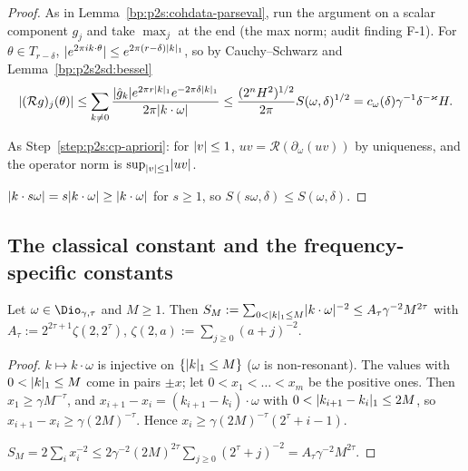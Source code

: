 \begin{proof}
\label{step:p2s2sd:cs-one}
As in Lemma~\ref{bp:p2s:cohdata-parseval}, run the argument on a scalar component $g_j$ and take $\max_j$ at the end (the max norm;
audit finding F-1). For $\theta\in T_{r-\delta}$, $\lvert e^{2\pi ik\cdot\theta}\rvert\le e^{2\pi(r-\delta)\lvert k\rvert_1}$, so by Cauchy--Schwarz and
Lemma~\ref{bp:p2s2sd:bessel}
\[
\lvert (\mathcal Rg)_j(\theta)\rvert\le\sum_{k\ne0}\frac{\lvert \hat g_k\rvert e^{2\pi r\lvert k\rvert_1}e^{-2\pi\delta\lvert k\rvert_1}}{2\pi\lvert k\cdot\omega\rvert}
\le\frac{(2^nH^2)^{1/2}}{2\pi}S(\omega,\delta)^{1/2}=c_\omega(\delta)\gamma^{-1}\delta^{-\varkappa}H.
\]

\label{step:p2s2sd:cs-ap}
As Step~\ref{step:p2s:cp-apriori}: for $\lvert v\rvert\le1$, $uv=\mathcal R(\partial_\omega(uv))$ by uniqueness, and the operator norm is
$\sup_{\lvert v\rvert\le1}\lvert uv\rvert$.

\label{step:p2s2sd:cs-ray}
$\lvert k\cdot s\omega\rvert=s\lvert k\cdot\omega\rvert\ge\lvert k\cdot\omega\rvert$ for $s\ge1$, so $S(s\omega,\delta)\le S(\omega,\delta)$.
\end{proof}

\subsection{The classical constant and the frequency-specific constants}

\begin{lemma}\label{bp:p2s2sd:shell}
Let $\omega\in\Dio_{\gamma,\tau}$ and $M\ge1$. Then $S_M:=\sum_{0<\lvert k\rvert_1\le M}\lvert k\cdot\omega\rvert^{-2}\le A_\tau\gamma^{-2}M^{2\tau}$ with
$A_\tau:=2^{2\tau+1}\zeta(2,2^\tau)$, $\zeta(2,a):=\sum_{j\ge0}(a+j)^{-2}$.
\end{lemma}

\begin{proof}
\label{step:p2s2sd:sh-order}
$k\mapsto k\cdot\omega$ is injective on $\{\lvert k\rvert_1\le M\}$ ($\omega$ is non-resonant). The values with $0<\lvert k\rvert_1\le M$ come in pairs
$\pm x$; let $0<x_1<\dots<x_m$ be the positive ones. Then $x_1\ge\gamma M^{-\tau}$, and $x_{i+1}-x_i=(k_{i+1}-k_i)\cdot\omega$ with
$0<\lvert k_{i+1}-k_i\rvert_1\le2M$, so $x_{i+1}-x_i\ge\gamma(2M)^{-\tau}$. Hence $x_i\ge\gamma(2M)^{-\tau}(2^\tau+i-1)$.

\label{step:p2s2sd:sh-sum}
$S_M=2\sum_ix_i^{-2}\le2\gamma^{-2}(2M)^{2\tau}\sum_{j\ge0}(2^\tau+j)^{-2}=A_\tau\gamma^{-2}M^{2\tau}$.
\end{proof}

